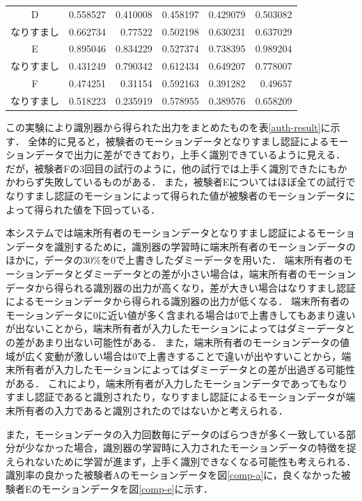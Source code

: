 \begin{table}[btph]
\begin{tabular}{|c|r|r|r|r|r|}
    D & 0.558527 & 0.410008 & 0.458197 & 0.429079 & 0.503082 \\
    なりすまし & 0.662734 & 0.77522 & 0.502198 & 0.630231 & 0.637029 \\ \hline
    E & 0.895046 & 0.834229 & 0.527374 & 0.738395 & 0.989204 \\
    なりすまし & 0.431249 & 0.790342 & 0.612434 & 0.649207 & 0.778007 \\ \hline
    F & 0.474251 & 0.31154 & 0.592163 & 0.391282 & 0.49657 \\
    なりすまし & 0.518223 & 0.235919 & 0.578955 & 0.389576 & 0.658209 \\ \hline
  \end{tabular}
\end{table}

この実験により識別器から得られた出力をまとめたものを表\ref{auth-result}に示す．
全体的に見ると，被験者のモーションデータとなりすまし認証によるモーションデータで出力に差ができており，上手く識別できているように見える．
だが，被験者Fの3回目の試行のように，他の試行では上手く識別できたにもかかわらず失敗しているものがある．
また，被験者Eについてはほぼ全ての試行でなりすまし認証のモーションによって得られた値が被験者のモーションデータによって得られた値を下回っている．

本システムでは端末所有者のモーションデータとなりすまし認証によるモーションデータを識別するために，識別器の学習時に端末所有者のモーションデータのほかに，データの30\%を0で上書きしたダミーデータを用いた．
端末所有者のモーションデータとダミーデータとの差が小さい場合は，端末所有者のモーションデータから得られる識別器の出力が高くなり，差が大きい場合はなりすまし認証によるモーションデータから得られる識別器の出力が低くなる．
端末所有者のモーションデータに0に近い値が多く含まれる場合は0で上書きしてもあまり違いが出ないことから，端末所有者が入力したモーションによってはダミーデータとの差があまり出ない可能性がある．
また，端末所有者のモーションデータの値域が広く変動が激しい場合は0で上書きすることで違いが出やすいことから，端末所有者が入力したモーションによってはダミーデータとの差が出過ぎる可能性がある．
これにより，端末所有者が入力したモーションデータであってもなりすまし認証であると識別されたり，なりすまし認証によるモーションデータが端末所有者の入力であると識別されたのではないかと考えられる．

また，モーションデータの入力回数毎にデータのばらつきが多く一致している部分が少なかった場合，識別器の学習時に入力されたモーションデータの特徴を捉えられないために学習が進まず，上手く識別できなくなる可能性も考えられる．
識別率の良かった被験者Aのモーションデータを図\ref{comp-a}に，良くなかった被験者Eのモーションデータを図\ref{comp-e}に示す．

